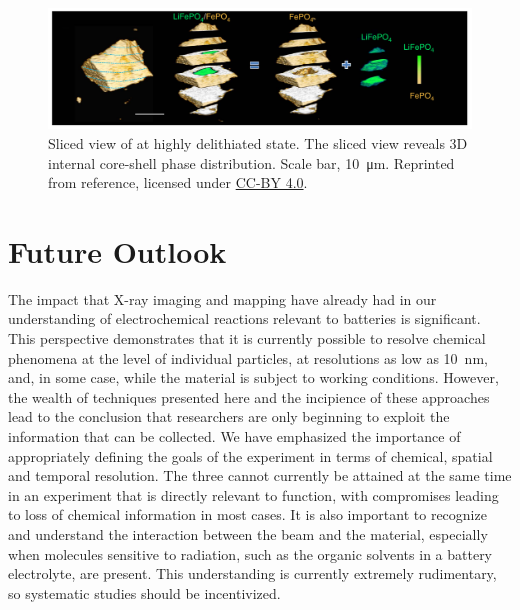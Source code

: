 \documentclass[journal=cmatex,manuscript=perspective]{achemso}
\begin{document}
\begin{figure}
  \includegraphics[width=\textwidth]{wang2016.png}
  \caption{Sliced view of  at highly delithiated
    state. The sliced view reveals 3D internal core-shell phase
    distribution. Scale bar, \SI{10}{\micro\metre}. Reprinted from
    reference\cite{wang2016}, licensed under
    \href{https://creativecommons.org/licenses/by/4.0/}{CC-BY 4.0}.}
  \label{figure:wang2016}
\end{figure}

\section{Future Outlook}

The impact that X-ray imaging and mapping have already had in our
understanding of electrochemical reactions relevant to batteries is
significant. This perspective demonstrates that it is currently
possible to resolve chemical phenomena at the level of individual
particles, at resolutions as low as \SI{10}{nm}, and, in some case,
while the material is subject to working conditions. However, the
wealth of techniques presented here and the incipience of these
approaches lead to the conclusion that researchers are only beginning
to exploit the information that can be collected. We have emphasized
the importance of appropriately defining the goals of the experiment
in terms of chemical, spatial and temporal resolution. The three
cannot currently be attained at the same time in an experiment that is
directly relevant to function, with compromises leading to loss of
chemical information in most cases. It is also important to recognize
and understand the interaction between the beam and the material,
especially when molecules sensitive to radiation, such as the organic
solvents in a battery electrolyte, are present. This understanding is
currently extremely rudimentary, so systematic studies should be
incentivized.
\end{document}
